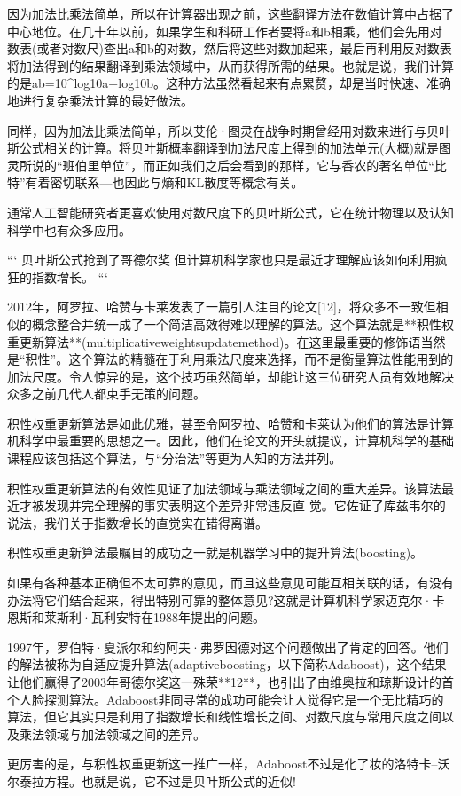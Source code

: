 因为加法比乘法简单，所以在计算器出现之前，这些翻译方法在数值计算中占据了中心地位。在几十年以前，如果学生和科研工作者要将a和b相乘，他们会先用对数表(或者对数尺)查出a和b的对数，然后将这些对数加起来，最后再利用反对数表将加法得到的结果翻译到乘法领域中，从而获得所需的结果。也就是说，我们计算的是ab=10^{log10a+log10b}。这种方法虽然看起来有点累赘，却是当时快速、准确地进行复杂乘法计算的最好做法。

同样，因为加法比乘法简单，所以艾伦·图灵在战争时期曾经用对数来进行与贝叶斯公式相关的计算。将贝叶斯概率翻译到加法尺度上得到的加法单元(大概)就是图灵所说的“班伯里单位”，而正如我们之后会看到的那样，它与香农的著名单位“比特”有着密切联系---也因此与熵和KL散度等概念有关。

通常人工智能研究者更喜欢使用对数尺度下的贝叶斯公式，它在统计物理以及认知科学中也有众多应用。

```
贝叶斯公式抢到了哥德尔奖
但计算机科学家也只是最近才理解应该如何利用疯狂的指数增长。
```

2012年，阿罗拉、哈赞与卡莱发表了一篇引人注目的论文[12]，将众多不一致但相似的概念整合并统一成了一个简洁高效得难以理解的算法。这个算法就是**积性权重更新算法**(multiplicativeweightsupdatemethod)。在这里最重要的修饰语当然是“积性”。这个算法的精髓在于利用乘法尺度来选择，而不是衡量算法性能用到的加法尺度。令人惊异的是，这个技巧虽然简单，却能让这三位研究人员有效地解决众多之前几代人都束手无策的问题。

积性权重更新算法是如此优雅，甚至令阿罗拉、哈赞和卡莱认为他们的算法是计算机科学中最重要的思想之一。因此，他们在论文的开头就提议，计算机科学的基础课程应该包括这个算法，与“分治法”等更为人知的方法并列。



积性权重更新算法的有效性见证了加法领域与乘法领域之间的重大差异。该算法最近才被发现并完全理解的事实表明这个差异非常违反直
觉。它佐证了库兹韦尔的说法，我们关于指数增长的直觉实在错得离谱。

积性权重更新算法最瞩目的成功之一就是机器学习中的提升算法(boosting)。

如果有各种基本正确但不太可靠的意见，而且这些意见可能互相关联的话，有没有办法将它们结合起来，得出特别可靠的整体意见?这就是计算机科学家迈克尔·卡恩斯和莱斯利·瓦利安特在1988年提出的问题。

1997年，罗伯特·夏派尔和约阿夫·弗罗因德对这个问题做出了肯定的回答。他们的解法被称为自适应提升算法(adaptiveboosting，以下简称Adaboost)，这个结果让他们赢得了2003年哥德尔奖这一殊荣**12**，也引出了由维奥拉和琼斯设计的首个人脸探测算法。Adaboost非同寻常的成功可能会让人觉得它是一个无比精巧的算法，但它其实只是利用了指数增长和线性增长之间、对数尺度与常用尺度之间以及乘法领域与加法领域之间的差异。

更厉害的是，与积性权重更新这一推广一样，Adaboost不过是化了妆的洛特卡–沃尔泰拉方程。也就是说，它不过是贝叶斯公式的近似!





